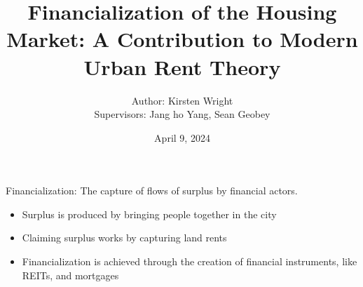 \documentclass[hide notes=show/only]{beamer} %
\title{ Financialization of the Housing Market: A Contribution to Modern Urban Rent Theory}
\author{
  Author: Kirsten Wright \\
  Supervisors: Jang
  ho Yang, Sean Geobey
}
\institute{SYDE Graduate Seminar \\[1ex] University of Waterloo}
\date{April 9, 2024}
\begin{document}
{
    \maketitle   
}


\begin{frame}{Financialization:
The capture of flows of surplus by financial actors.}
\begin{itemize} \Large
    \item Surplus is produced by bringing people together in the city 
    \item Claiming surplus works by capturing land rents %
    \item Financialization is achieved through the creation of financial instruments, like REITs, and mortgages 
\end{itemize}
\end{frame}

\begin{frame}
\begin{figure}[!ht]
\centering
\resizebox{0.85\textwidth}{!}{}
\label{fig:fieldsplus}
\end{figure}
\end{frame}
\end{document}
